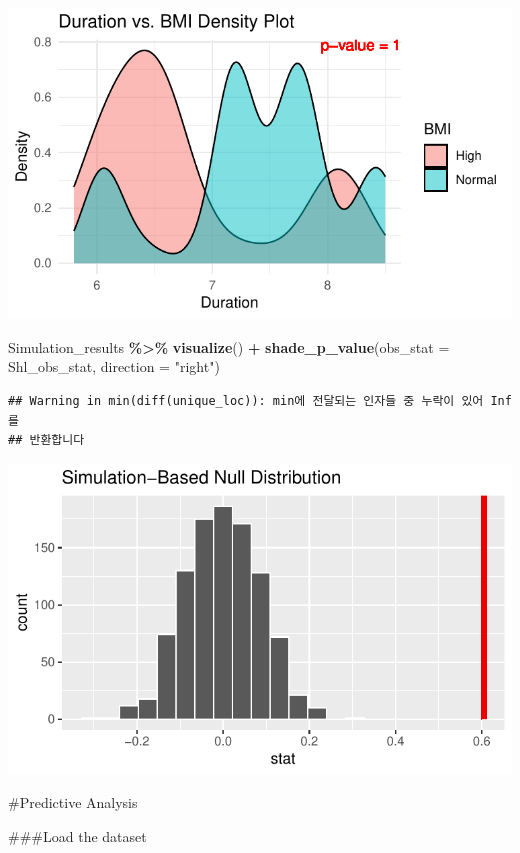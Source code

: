 \documentclass[
  11pt,
]{article}
\newenvironment{Shaded}{\begin{snugshade}}{\end{snugshade}}
\newcommand{\AttributeTok}[1]{\textcolor[rgb]{0.13,0.29,0.53}{#1}}
\newcommand{\FunctionTok}[1]{\textcolor[rgb]{0.13,0.29,0.53}{\textbf{#1}}}
\newcommand{\NormalTok}[1]{#1}
\newcommand{\SpecialCharTok}[1]{\textcolor[rgb]{0.81,0.36,0.00}{\textbf{#1}}}
\newcommand{\StringTok}[1]{\textcolor[rgb]{0.31,0.60,0.02}{#1}}
\begin{document}
\begin{center}\includegraphics[width=0.7\linewidth]{SleepHelath_files/figure-latex/unnamed-chunk-13-1} \end{center}

\begin{Shaded}
\begin{Highlighting}[]
\NormalTok{Simulation\_results }\SpecialCharTok{\%\textgreater{}\%}
 \FunctionTok{visualize}\NormalTok{() }\SpecialCharTok{+}
 \FunctionTok{shade\_p\_value}\NormalTok{(}\AttributeTok{obs\_stat =}\NormalTok{ Shl\_obs\_stat, }\AttributeTok{direction =} \StringTok{"right"}\NormalTok{)}
\end{Highlighting}
\end{Shaded}

\begin{verbatim}
## Warning in min(diff(unique_loc)): min에 전달되는 인자들 중 누락이 있어 Inf를
## 반환합니다
\end{verbatim}

\begin{center}\includegraphics[width=0.7\linewidth]{SleepHelath_files/figure-latex/unnamed-chunk-14-1} \end{center}

\#Predictive Analysis

\#\#\#Load the dataset
\end{document}
